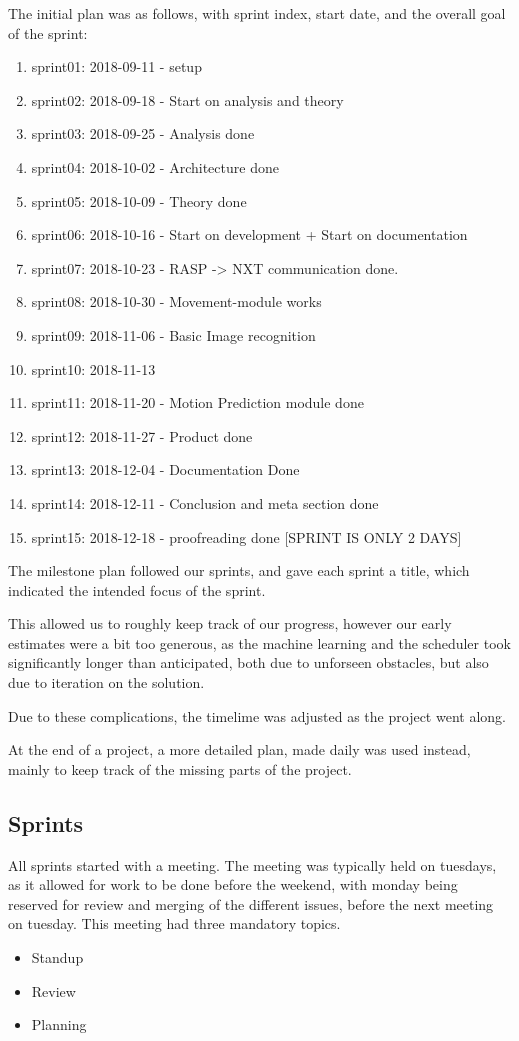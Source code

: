 The initial plan was as follows, with sprint index, start date, and the overall goal of the sprint:
\begin{enumerate}
	\item sprint01: 2018-09-11 - setup
	\item sprint02: 2018-09-18 - Start on analysis and theory
	\item sprint03: 2018-09-25 - Analysis done 
	\item sprint04: 2018-10-02 - Architecture done
	\item sprint05: 2018-10-09 - Theory done
	\item sprint06: 2018-10-16 - Start on development + Start on documentation
	\item sprint07: 2018-10-23 - RASP -> NXT communication done.
	\item sprint08: 2018-10-30 - Movement-module works
	\item sprint09: 2018-11-06 - Basic Image recognition
	\item sprint10: 2018-11-13
	\item sprint11: 2018-11-20 - Motion Prediction module done
	\item sprint12: 2018-11-27 - Product done
	\item sprint13: 2018-12-04 - Documentation Done
	\item sprint14: 2018-12-11 - Conclusion and meta section done
	\item sprint15: 2018-12-18 - proofreading done [SPRINT IS ONLY 2 DAYS]
\end{enumerate}

The milestone plan followed our sprints, and gave each sprint a title, which indicated the intended focus of the sprint.

This allowed us to roughly keep track of our progress, however our early estimates were a bit too generous, as the machine learning and the scheduler took significantly longer than anticipated, both due to unforseen obstacles, but also due to iteration on the solution.

Due to these complications, the timelime was adjusted as the project went along.

At the end of a project, a more detailed plan, made daily was used instead, mainly to keep track of the missing parts of the project.


\subsection{Sprints}
All sprints started with a meeting.
The meeting was typically held on tuesdays, as it allowed for work to be done before the weekend, with monday being reserved for review and merging of the different issues, before the next meeting on tuesday.
This meeting had three mandatory topics.
\begin{itemize}
	\item Standup
	\item Review
	\item Planning
\end{itemize}

